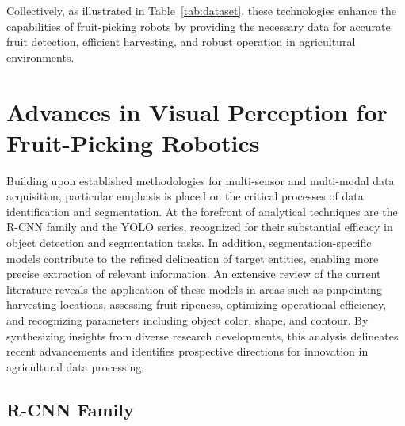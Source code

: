 \documentclass[a4paper,fleqn]{cas-dc}
\begin{document}
Collectively, as illustrated in Table~\ref{tab:dataset}, these technologies enhance the capabilities of fruit-picking robots by providing the necessary data for accurate fruit detection, efficient harvesting, and robust operation in agricultural environments.

\section{Advances in Visual Perception for Fruit-Picking Robotics}

Building upon established methodologies for multi-sensor and multi-modal data acquisition, particular emphasis is placed on the critical processes of data identification and segmentation. At the forefront of analytical techniques are the R-CNN family and the YOLO series, recognized for their substantial efficacy in object detection and segmentation tasks. In addition, segmentation-specific models contribute to the refined delineation of target entities, enabling more precise extraction of relevant information. An extensive review of the current literature reveals the application of these models in areas such as pinpointing harvesting locations, assessing fruit ripeness, optimizing operational efficiency, and recognizing parameters including object color, shape, and contour. By synthesizing insights from diverse research developments, this analysis delineates recent advancements and identifies prospective directions for innovation in agricultural data processing.


\subsection{R-CNN Family}
\end{document}
